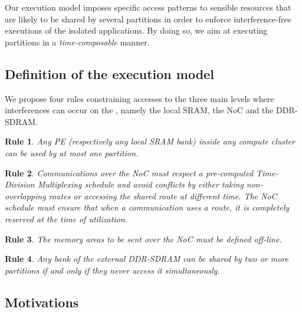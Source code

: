 \documentclass[main.tex]{subfiles}
\begin{document}
Our execution model imposes specific access patterns to sensible resources that are likely to be shared by several partitions in order to enforce interference-free executions of the isolated applications. By doing so, we aim at executing partitions in a \emph{time-composable} manner.


\subsection{Definition of the execution model}
We propose four rules constraining accesses to the three main levels where interferences can occur on the \mppalong, namely the local SRAM, the NoC and the DDR-SDRAM.

\newtheorem{emrule}{Rule}
\begin{emrule}
    Any PE (respectively any local SRAM bank) inside any compute cluster can be used by at most one partition.
    \label{emrule_1}
\end{emrule}

\begin{emrule}
    Communications over the NoC must respect a pre-computed Time-Division Multiplexing schedule and avoid conflicts by either taking non-overlapping routes or accessing the shared route at different time. The NoC schedule must ensure that when a communication uses a route, it is completely reserved at the time of utilization.
    \label{emrule_2}
\end{emrule}

\begin{emrule}
    The memory areas to be sent over the NoC must be defined off-line.
    \label{emrule_3}
\end{emrule}

\begin{emrule}
    Any bank of the external DDR-SDRAM can be shared by two or more partitions if and only if they never access it simultaneously.
    \label{emrule_4}
\end{emrule}

\subsection{Motivations}
\end{document}
